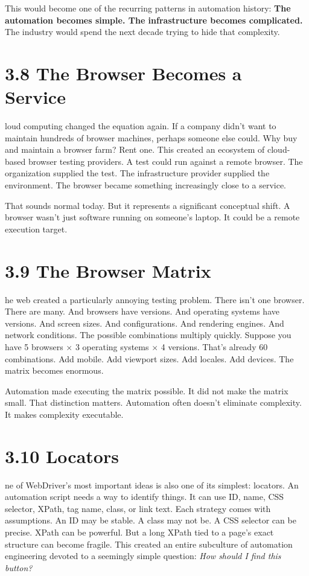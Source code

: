\documentclass[11pt, a4paper, openany]{book}
\newcommand{\initialcap}[1]{{\fontfamily{lmss}\selectfont\huge\textbf{#1}}}
\begin{document}
This would become one of the recurring patterns in automation history: \textbf{The automation becomes simple. The infrastructure becomes complicated.} The industry would spend the next decade trying to hide that complexity.

\section{3.8 The Browser Becomes a Service}
\noindent \initialcap{C}loud computing changed the equation again. If a company didn't want to maintain hundreds of browser machines, perhaps someone else could. Why buy and maintain a browser farm? Rent one. This created an ecosystem of cloud-based browser testing providers. A test could run against a remote browser. The organization supplied the test. The infrastructure provider supplied the environment. The browser became something increasingly close to a service.

That sounds normal today. But it represents a significant conceptual shift. A browser wasn't just software running on someone's laptop. It could be a remote execution target.

\section{3.9 The Browser Matrix}
\noindent \initialcap{T}he web created a particularly annoying testing problem. There isn't one browser. There are many. And browsers have versions. And operating systems have versions. And screen sizes. And configurations. And rendering engines. And network conditions. The possible combinations multiply quickly. Suppose you have 5 browsers $\times$ 3 operating systems $\times$ 4 versions. That's already 60 combinations. Add mobile. Add viewport sizes. Add locales. Add devices. The matrix becomes enormous.

Automation made executing the matrix possible. It did not make the matrix small. That distinction matters. Automation often doesn't eliminate complexity. It makes complexity executable.

\section{3.10 Locators}
\noindent \initialcap{O}ne of WebDriver's most important ideas is also one of its simplest: locators. An automation script needs a way to identify things. It can use ID, name, CSS selector, XPath, tag name, class, or link text. Each strategy comes with assumptions. An ID may be stable. A class may not be. A CSS selector can be precise. XPath can be powerful. But a long XPath tied to a page's exact structure can become fragile. This created an entire subculture of automation engineering devoted to a seemingly simple question: \textit{How should I find this button?}
\end{document}
